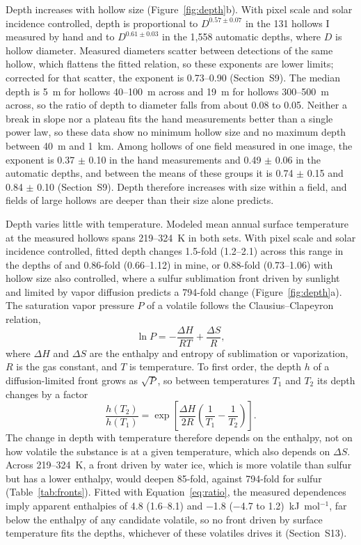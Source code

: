 \documentclass[article,review]{planetary}
\begin{document}
Depth increases with hollow size (Figure~\ref{fig:depth}b). With pixel scale and solar incidence controlled, depth is proportional to $D^{0.57 \pm 0.07}$ in the 131 hollows I measured by hand and to $D^{0.61 \pm 0.03}$ in the 1,558 automatic depths, where $D$ is hollow diameter. Measured diameters scatter between detections of the same hollow, which flattens the fitted relation, so these exponents are lower limits; corrected for that scatter, the exponent is 0.73--0.90 (Section~S9). The median depth is 5~m for hollows 40--100~m across and 19~m for hollows 300--500~m across, so the ratio of depth to diameter falls from about 0.08 to 0.05. Neither a break in slope nor a plateau fits the hand measurements better than a single power law, so these data show no minimum hollow size and no maximum depth between 40~m and 1~km. Among hollows of one field measured in one image, the exponent is 0.37 $\pm$ 0.10 in the hand measurements and 0.49 $\pm$ 0.06 in the automatic depths, and between the means of these groups it is 0.74 $\pm$ 0.15 and 0.84 $\pm$ 0.10 (Section~S9). Depth therefore increases with size within a field, and fields of large hollows are deeper than their size alone predicts.

Depth varies little with temperature. Modeled mean annual surface temperature at the measured hollows spans 219--324~K in both sets. With pixel scale and solar incidence controlled, fitted depth changes 1.5-fold (1.2--2.1) across this range in the depths of \textcite{blewett2016} and 0.86-fold (0.66--1.12) in mine, or 0.88-fold (0.73--1.06) with hollow size also controlled, where a sulfur sublimation front driven by sunlight and limited by vapor diffusion \parencite{phillips2021} predicts a 794-fold change (Figure~\ref{fig:depth}a). The saturation vapor pressure $P$ of a volatile follows the Clausius--Clapeyron relation,
\begin{equation}
    \ln P = -\frac{\Delta H}{RT} + \frac{\Delta S}{R},
    \label{eq:cc}
\end{equation}
where $\Delta H$ and $\Delta S$ are the enthalpy and entropy of sublimation or vaporization, $R$ is the gas constant, and $T$ is temperature. To first order, the depth $h$ of a diffusion-limited front grows as $\sqrt{P}$, so between temperatures $T_1$ and $T_2$ its depth changes by a factor
\begin{equation}
    \frac{h(T_2)}{h(T_1)} = \exp\left[\frac{\Delta H}{2R}\left(\frac{1}{T_1} - \frac{1}{T_2}\right)\right].
    \label{eq:ratio}
\end{equation}
The change in depth with temperature therefore depends on the enthalpy, not on how volatile the substance is at a given temperature, which also depends on $\Delta S$. Across 219--324~K, a front driven by water ice, which is more volatile than sulfur but has a lower enthalpy, would deepen 85-fold, against 794-fold for sulfur (Table~\ref{tab:fronts}). Fitted with Equation~\ref{eq:ratio}, the measured dependences imply apparent enthalpies of 4.8 (1.6--8.1) and $-$1.8 ($-$4.7 to 1.2)~kJ~mol$^{-1}$, far below the enthalpy of any candidate volatile, so no front driven by surface temperature fits the depths, whichever of these volatiles drives it (Section~S13).
\end{document}
